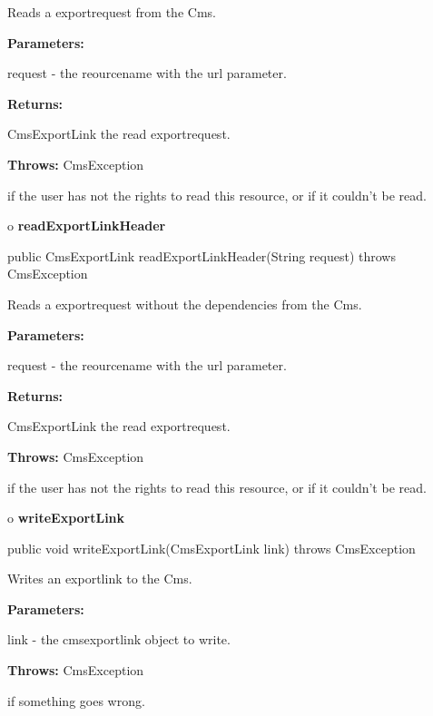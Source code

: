 \begin{description}
\htmlDD Reads a exportrequest from the Cms. 

\begin{description}
\item {\bf Parameters:}  

request - the reourcename with the url parameter.  
\item {\bf Returns:}  

CmsExportLink the read exportrequest.  
\item {\bf Throws:} CmsException  

if the user has not the rights to read this resource, or if it couldn't be
read.  
\end{description}

\end{description}

o {\bf readExportLinkHeader} 

\begin{PRE}
 public CmsExportLink readExportLinkHeader(String request) throws CmsException
\end{PRE}

\begin{description}
\htmlDD Reads a exportrequest without the dependencies from the Cms. 

\begin{description}
\item {\bf Parameters:}  

request - the reourcename with the url parameter.  
\item {\bf Returns:}  

CmsExportLink the read exportrequest.  
\item {\bf Throws:} CmsException  

if the user has not the rights to read this resource, or if it couldn't be
read.  
\end{description}

\end{description}

o {\bf writeExportLink} 

\begin{PRE}
 public void writeExportLink(CmsExportLink link) throws CmsException
\end{PRE}

\begin{description}
\htmlDD Writes an exportlink to the Cms. 

\begin{description}
\item {\bf Parameters:}  

link - the cmsexportlink object to write.  
\item {\bf Throws:} CmsException  

if something goes wrong.  
\end{description}

\end{description}

